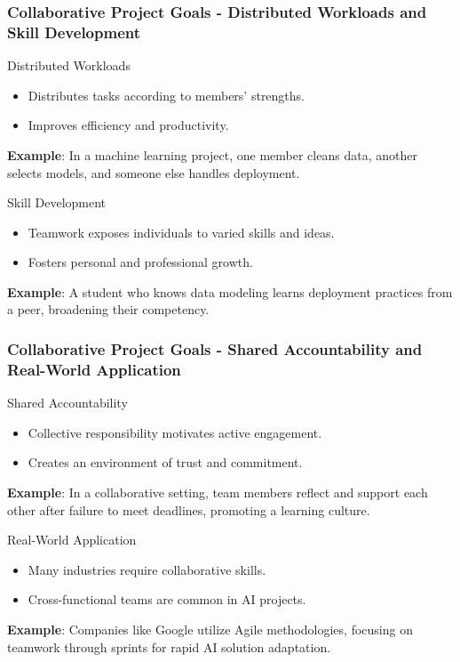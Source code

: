 \documentclass[aspectratio=169]{beamer}
\begin{document}
\begin{frame}[fragile]
    \frametitle{Collaborative Project Goals - Distributed Workloads and Skill Development}
    \begin{block}{Distributed Workloads}
        \begin{itemize}
            \item Distributes tasks according to members’ strengths.
            \item Improves efficiency and productivity.
        \end{itemize}
        \textbf{Example}: In a machine learning project, one member cleans data, another selects models, and someone else handles deployment.
    \end{block}
    
    \begin{block}{Skill Development}
        \begin{itemize}
            \item Teamwork exposes individuals to varied skills and ideas.
            \item Fosters personal and professional growth.
        \end{itemize}
        \textbf{Example}: A student who knows data modeling learns deployment practices from a peer, broadening their competency.
    \end{block}
\end{frame}

\begin{frame}[fragile]
    \frametitle{Collaborative Project Goals - Shared Accountability and Real-World Application}
    \begin{block}{Shared Accountability}
        \begin{itemize}
            \item Collective responsibility motivates active engagement.
            \item Creates an environment of trust and commitment.
        \end{itemize}
        \textbf{Example}: In a collaborative setting, team members reflect and support each other after failure to meet deadlines, promoting a learning culture.
    \end{block}
    
    \begin{block}{Real-World Application}
        \begin{itemize}
            \item Many industries require collaborative skills.
            \item Cross-functional teams are common in AI projects.
        \end{itemize}
        \textbf{Example}: Companies like Google utilize Agile methodologies, focusing on teamwork through sprints for rapid AI solution adaptation.
    \end{block}
\end{frame}
\end{document}
